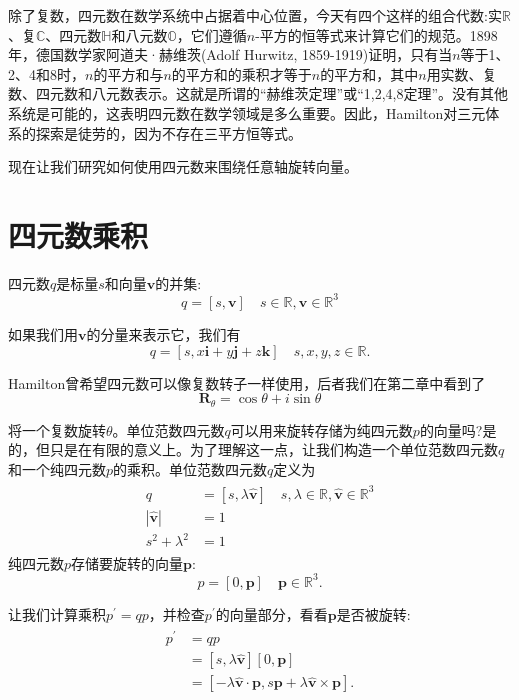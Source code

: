 除了复数，四元数在数学系统中占据着中心位置，今天有四个这样的组合代数:实$\mathbb{R}$、复$\mathbb{C}$、四元数$\mathbb{H}$和八元数$\mathbb{O}$，它们遵循$n$-平方的恒等式来计算它们的规范。1898年，德国数学家阿道夫·赫维茨(Adolf Hurwitz, 1859-1919)证明，只有当$n$等于1、2、4和8时，$n$的平方和与$n$的平方和的乘积才等于$n$的平方和，其中$n$用实数、复数、四元数和八元数表示。这就是所谓的“赫维茨定理”或“1,2,4,8定理”。没有其他系统是可能的，这表明四元数在数学领域是多么重要。因此，Hamilton对三元体系的探索是徒劳的，因为不存在三平方恒等式。

现在让我们研究如何使用四元数来围绕任意轴旋转向量。

\section{四元数乘积}
四元数$q$是标量$s$和向量$\mathbf{v}$的并集:
$$
q=[s, \mathbf{v}] \quad s \in \mathbb{R}, \mathbf{v} \in \mathbb{R}^{3}
$$

如果我们用$\mathbf{v}$的分量来表示它，我们有
$$
q=[s, x \mathbf{i}+y \mathbf{j}+z \mathbf{k}] \quad s, x, y, z \in \mathbb{R} .
$$

Hamilton曾希望四元数可以像复数转子一样使用，后者我们在第二章中看到了
$$
\mathbf{R}_{\theta}=\cos \theta+i \sin \theta
$$

将一个复数旋转$\theta$。单位范数四元数$q$可以用来旋转存储为纯四元数$p$的向量吗?是的，但只是在有限的意义上。为了理解这一点，让我们构造一个单位范数四元数$q$和一个纯四元数$p$的乘积。单位范数四元数$q$定义为
\begin{align}
\begin{aligned}
q & =[s, \lambda \hat{\mathbf{v}}] \quad s, \lambda \in \mathbb{R}, \hat{\mathbf{v}} \in \mathbb{R}^{3} \\
|\hat{\mathbf{v}}| & =1 \\
s^{2}+\lambda^{2} & =1
\end{aligned}
\end{align}
纯四元数$p$存储要旋转的向量$\mathbf{p}$:
$$
p=[0, \mathbf{p}] \quad \mathbf{p} \in \mathbb{R}^{3} .
$$

让我们计算乘积$p^{\prime}=q p$，并检查$p^{\prime}$的向量部分，看看$ \mathbf{p}$是否被旋转:
\begin{align}
\begin{aligned}
p^{\prime} & =q p \\
& =[s, \lambda \hat{\mathbf{v}}][0, \mathbf{p}] \\
& =[-\lambda \hat{\mathbf{v}} \cdot \mathbf{p}, s \mathbf{p}+\lambda \hat{\mathbf{v}} \times \mathbf{p}] .
\end{aligned}
\end{align}

